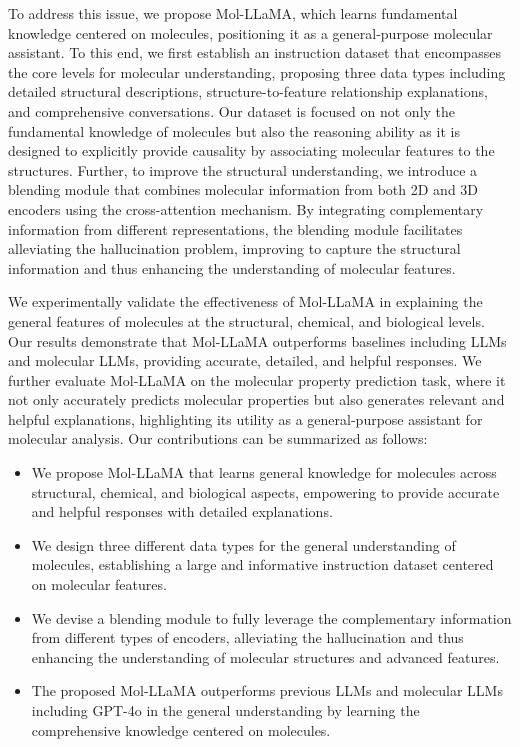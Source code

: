 To address this issue, we propose Mol-LLaMA, which learns fundamental knowledge centered on molecules, positioning it as a general-purpose molecular assistant. To this end, we first establish an instruction dataset that encompasses the core levels for molecular understanding, proposing three data types including detailed structural descriptions, structure-to-feature relationship explanations, and comprehensive conversations. Our dataset is focused on not only the fundamental knowledge of molecules but also the reasoning ability as it is designed to explicitly provide causality by associating molecular features to the structures. Further, to improve the structural understanding, we introduce a blending module that combines molecular information from both 2D and 3D encoders using the cross-attention mechanism. By integrating complementary information from different representations, the blending module facilitates alleviating the hallucination problem, improving to capture the structural information and thus enhancing the understanding of molecular features.

We experimentally validate the effectiveness of Mol-LLaMA in explaining the general features of molecules at the structural, chemical, and biological levels. Our results demonstrate that Mol-LLaMA outperforms baselines including LLMs and molecular LLMs, providing accurate, detailed, and helpful responses. We further evaluate Mol-LLaMA on the molecular property prediction task, where it not only accurately predicts molecular properties but also generates relevant and helpful explanations, highlighting its utility as a general-purpose assistant for molecular analysis. Our contributions can be summarized as follows:
\vspace{-0.1in}
\begin{itemize}[itemsep=0.5mm, parsep=3pt, leftmargin=*]
    \item We propose Mol-LLaMA that learns general knowledge for molecules across structural, chemical, and biological aspects, empowering to provide accurate and helpful responses with detailed explanations.
    \item We design three different data types for the general understanding of molecules, establishing a large and informative instruction dataset centered on molecular features.
    \item We devise a blending module to fully leverage the complementary information from different types of encoders, alleviating the hallucination and thus enhancing the understanding of molecular structures and advanced features.
    \item The proposed Mol-LLaMA outperforms previous LLMs and molecular LLMs including GPT-4o in the general understanding by learning the comprehensive knowledge centered on molecules.
\end{itemize}
